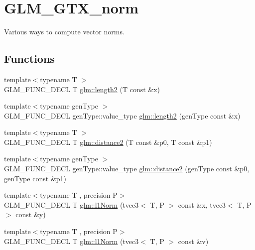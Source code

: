 \hypertarget{group__gtx__norm}{\section{G\-L\-M\-\_\-\-G\-T\-X\-\_\-norm}
\label{group__gtx__norm}
}


Various ways to compute vector norms.  


\subsection*{Functions}
\begin{DoxyCompactItemize}
\item 
{\footnotesize template$<$typename T $>$ }\\G\-L\-M\-\_\-\-F\-U\-N\-C\-\_\-\-D\-E\-C\-L T \hyperlink{group__gtx__norm_ga08c670024cd230e22f8b853f185ff533}{glm\-::length2} (T const \&x)
\item 
{\footnotesize template$<$typename gen\-Type $>$ }\\G\-L\-M\-\_\-\-F\-U\-N\-C\-\_\-\-D\-E\-C\-L gen\-Type\-::value\-\_\-type \hyperlink{group__gtx__norm_gaa279ba7fdecbed3f9f2b60502b7ec8ca}{glm\-::length2} (gen\-Type const \&x)
\item 
{\footnotesize template$<$typename T $>$ }\\G\-L\-M\-\_\-\-F\-U\-N\-C\-\_\-\-D\-E\-C\-L T \hyperlink{group__gtx__norm_ga3544f6288d3bce2cf2a9f6ebe39e0557}{glm\-::distance2} (T const \&p0, T const \&p1)
\item 
{\footnotesize template$<$typename gen\-Type $>$ }\\G\-L\-M\-\_\-\-F\-U\-N\-C\-\_\-\-D\-E\-C\-L gen\-Type\-::value\-\_\-type \hyperlink{group__gtx__norm_gaec2d9df62436879b48207d39516f3788}{glm\-::distance2} (gen\-Type const \&p0, gen\-Type const \&p1)
\item 
{\footnotesize template$<$typename T , precision P$>$ }\\G\-L\-M\-\_\-\-F\-U\-N\-C\-\_\-\-D\-E\-C\-L T \hyperlink{group__gtx__norm_gaebe5a39b06e262e615622129f37da4f4}{glm\-::l1\-Norm} (tvec3$<$ T, P $>$ const \&x, tvec3$<$ T, P $>$ const \&y)
\item 
{\footnotesize template$<$typename T , precision P$>$ }\\G\-L\-M\-\_\-\-F\-U\-N\-C\-\_\-\-D\-E\-C\-L T \hyperlink{group__gtx__norm_ga6d5964f09cdb43803496a5ee3ced71cb}{glm\-::l1\-Norm} (tvec3$<$ T, P $>$ const \&v)
\item 

\end{DoxyCompactItemize}
